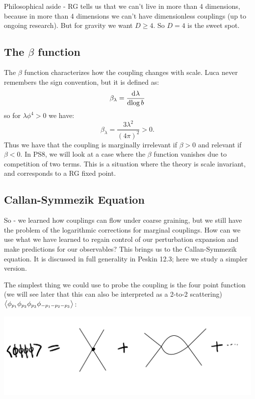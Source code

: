 Philosophical aside - RG tells us that we can't live in more than 4 dimensions, because in more than 4 dimensions we can't have dimensionless couplings (up to ongoing research). But for gravity we want $D \geq 4$. So $D = 4$ is the sweet spot.

\subsection{The $\beta$ function}
The $\beta$ function characterizes how the coupling changes with scale. Luca never remembers the sign convention, but it is defined as:
\begin{equation}
    \beta_\lambda = \dod{\lambda}{\log b}
\end{equation}
so for $\lambda \phi^4 > 0$ we have:
\begin{equation}
    \beta_\lambda = \frac{3\lambda^2}{(4\pi)^2} > 0.
\end{equation}
Thus we have that the coupling is marginally irrelevant if $\beta > 0$ and relevant if $\beta < 0$. In PS8, we will look at a case where the $\beta$ function vanishes due to competition of two terms. This is a situation where the theory is scale invariant, and corresponds to a RG fixed point.

\subsection{Callan-Symmezik Equation}
So - we learned how couplings can flow under coarse graining, but we still have the problem of the logarithmic corrections for marginal couplings. How can we use what we have learned to regain control of our perturbation expansion and make predictions for our observables? This brings us to the Callan-Symmezik equation. It is discussed in full generality in Peskin 12.3; here we study a simpler version.

The simplest thing we could use to probe the coupling is the four point function (we will see later that this can also be interpreted as a 2-to-2 scattering) $\left< \phi_{p_1}\phi_{p_2}\phi_{p_3}\phi_{-p_1-p_2-p_3} \right>$:

\begin{center}
    \includegraphics[scale=0.3]{Lectures/Figures/lec15-phi4observable.png}
\end{center}


